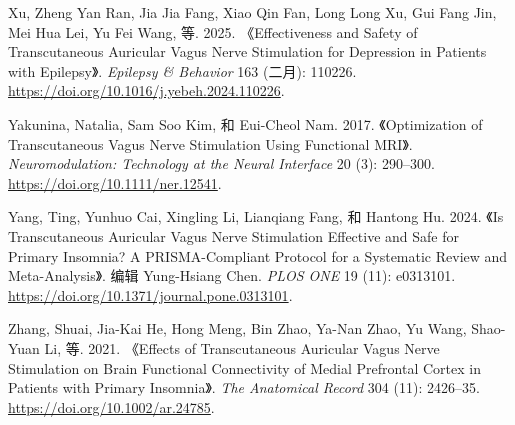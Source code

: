 \documentclass[
  Letterpaper,
]{scrbook}
\newlength{\cslhangindent}
\newenvironment{CSLReferences}[2] %
 {\begin{list}{}{%
  \setlength{\itemindent}{0pt}
  \setlength{\leftmargin}{0pt}
  \setlength{\parsep}{0pt}
  \ifodd #1
   \setlength{\leftmargin}{\cslhangindent}
   \setlength{\itemindent}{-1\cslhangindent}
  \fi
  \setlength{\itemsep}{#2\baselineskip}}}
 {\end{list}}
\begin{document}
\begin{CSLReferences}{1}{0}
Xu, Zheng Yan Ran, Jia Jia Fang, Xiao Qin Fan, Long Long Xu, Gui Fang
Jin, Mei Hua Lei, Yu Fei Wang, 等. 2025. {《Effectiveness and Safety of
Transcutaneous Auricular Vagus Nerve Stimulation for Depression in
Patients with Epilepsy》}. \emph{Epilepsy \& Behavior} 163 (二月):
110226. \url{https://doi.org/10.1016/j.yebeh.2024.110226}.

Yakunina, Natalia, Sam Soo Kim, 和 Eui-Cheol Nam. 2017. {《Optimization
of {Transcutaneous Vagus Nerve Stimulation Using Functional MRI}》}.
\emph{Neuromodulation: Technology at the Neural Interface} 20 (3):
290--300. \url{https://doi.org/10.1111/ner.12541}.

Yang, Ting, Yunhuo Cai, Xingling Li, Lianqiang Fang, 和 Hantong Hu.
2024. {《Is Transcutaneous Auricular Vagus Nerve Stimulation Effective
and Safe for Primary Insomnia? {A PRISMA-Compliant} Protocol for a
Systematic Review and Meta-Analysis》}. 编辑 Yung-Hsiang Chen.
\emph{PLOS ONE} 19 (11): e0313101.
\url{https://doi.org/10.1371/journal.pone.0313101}.

Zhang, Shuai, Jia-Kai He, Hong Meng, Bin Zhao, Ya-Nan Zhao, Yu Wang,
Shao-Yuan Li, 等. 2021. {《Effects of Transcutaneous Auricular Vagus
Nerve Stimulation on Brain Functional Connectivity of Medial Prefrontal
Cortex in Patients with Primary Insomnia》}. \emph{The Anatomical
Record} 304 (11): 2426--35. \url{https://doi.org/10.1002/ar.24785}.

\end{CSLReferences}


\backmatter

\printindex
\end{document}
